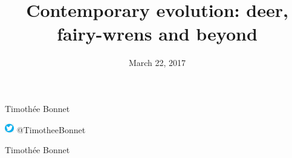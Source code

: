\documentclass[10pt]{beamer}%
\title[]{Contemporary evolution: deer, fairy-wrens and beyond}
\date{March 22, 2017}
\author[\footnotesize Timoth\'ee Bonnet ]{ }
\begin{document}
\begin{frame}{Timoth\'ee Bonnet}

\vfill
\includegraphics[width=0.03\textwidth]{Figures/tweeter.jpeg} @TimotheeBonnet
\end{frame}
\begin{frame}{Timoth\'ee Bonnet}

\end{frame}
\end{document}
